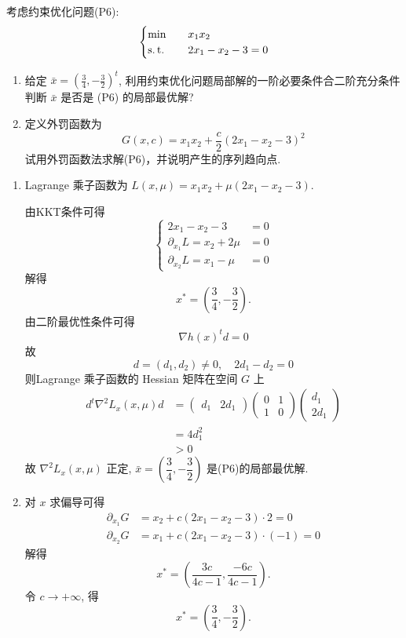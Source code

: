 \begin{Problem}
    考虑约束优化问题(P6):
    \[\begin{cases}
        \min \quad &x_1x_2\\
        \operatorname{s.t.} \quad &2x_1 - x_2 - 3 = 0
    \end{cases}\]
    \begin{enumerate}
        \item 给定 $\bar{x} = \left(\frac{3}{4}, -\frac{3}{2}\right)^t$, 利用约束优化问题局部解的一阶必要条件合二阶充分条件判断 $\bar{x}$ 是否是 (P6) 的局部最优解?
        \item 定义外罚函数为
        \[G(x, c) = x_1x_2 + \dfrac{c}{2}\left(2x_1 - x_2 - 3\right)^2\]
        试用外罚函数法求解(P6)，并说明产生的序列趋向点.
    \end{enumerate}

    \Answer \text{}
    \begin{enumerate}
        \item Lagrange 乘子函数为 $L(x, \mu) = x_1x_2 + \mu(2x_1 - x_2 - 3)$.
        
        由KKT条件可得 
        \[\begin{cases}
            2x_1 - x_2 - 3 &= 0\\
            \partial_{x_1}L = x_2 + 2\mu &= 0\\
            \partial_{x_2}L = x_1 - \mu &= 0
        \end{cases}\]
        解得
        \[x^* = \left(\dfrac{3}{4}, -\dfrac{3}{2}\right).\]
        由二阶最优性条件可得 
        \[\nabla h(x)^td = 0\]
        故
        \[d = \left(d_1, d_2\right) \neq 0,\quad 2d_1 - d_2 = 0\]
        则Lagrange 乘子函数的 Hessian 矩阵在空间 $G$ 上 
        \begin{align*}
            d^t\nabla^2L_x(x, \mu)d &= \begin{pmatrix}
                d_1 & 2d_1
            \end{pmatrix}\begin{pmatrix}
                0 & 1 \\ 1 & 0
            \end{pmatrix}\begin{pmatrix}
                d_1 \\ 2d_1
            \end{pmatrix}\\
            &= 4d_1^2\\
            &> 0
        \end{align*}
        故 $\nabla^2L_x(x, \mu)$ 正定, $\bar{x} = \left(\dfrac{3}{4}, -\dfrac{3}{2}\right)$ 是(P6)的局部最优解.
        \item 对 $x$ 求偏导可得 
        \begin{align*}
            \partial_{x_1}G &= x_2 + c(2x_1 - x_2 - 3) \cdot 2 = 0\\
            \partial_{x_2}G &= x_1 + c(2x_1 - x_2 - 3) \cdot (-1) = 0
        \end{align*}
        解得 
        \[x^* = \left(\dfrac{3c}{4c - 1}, \dfrac{-6c}{4c - 1}\right).\]
        令 $c \to +\infty$, 得
        \[x^* = \left(\dfrac{3}{4}, -\dfrac{3}{2}\right).\]
    \end{enumerate}
\end{Problem}


